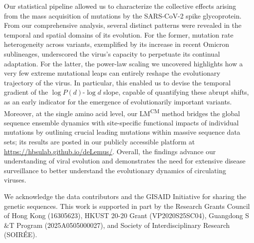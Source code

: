 \documentclass[%
 reprint,
superscriptaddress,
 amsmath,amssymb,
 aps,
]{revtex4-2}
\begin{document}
Our statistical pipeline allowed us to characterize the collective effects arising from the mass acquisition of mutations by the SARS-CoV-2 spike glycoprotein. From our comprehensive analysis, several distinct patterns were revealed in the temporal and spatial domains of its evolution. For the former, mutation rate heterogeneity across variants, exemplified by its increase in recent Omicron sublineages, underscored the virus's capacity to perpetuate its continual adaptation. For the latter, the power-law scaling we uncovered highlights how a very few extreme mutational leaps can entirely reshape the evolutionary trajectory of the virus. In particular, this enabled us to devise the temporal gradient of the $\log{P(\bm{\mathit{d}})}$-$\log{\bm{\mathit{d}}}$ slope, capable of quantifying these abrupt shifts, as an early indicator for the emergence of evolutionarily important variants. Moreover, at the single amino acid level, our LM\textsuperscript{CM} method bridges the global sequence ensemble dynamics with site-specific functional impacts of individual mutations by outlining crucial leading mutations within massive sequence data sets; its results are posted in our publicly accessible platform at \href{https://hbsulab.github.io/deLemus/}{https://hbsulab.github.io/deLemus/}. Overall, the findings advance our understanding of viral evolution and demonstrates the need for extensive disease surveillance to better understand the evolutionary dynamics of circulating viruses.


\begin{acknowledgments}

We acknowledge the data contributors and the GISAID Initiative for sharing the genetic sequences. This work is supported in part by the Research Grants Council of Hong Kong (16305623), HKUST 20-20 Grant (VP2020S25SC04), Guangdong S$\&$T Program (2025A0505000027), and Society of Interdisciplinary Research (SOIRÉE).

\end{acknowledgments}

\printbibliography
\end{document}

